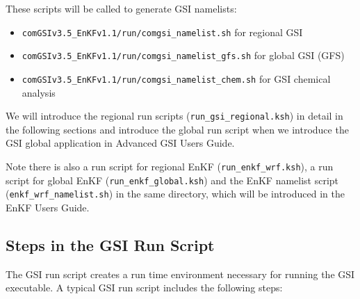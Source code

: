 These scripts will be called to generate GSI namelists:
\begin{itemize}
\item \verb|comGSIv3.5_EnKFv1.1/run/comgsi_namelist.sh| for regional GSI
\item \verb|comGSIv3.5_EnKFv1.1/run/comgsi_namelist_gfs.sh| for global GSI (GFS)
\item \verb|comGSIv3.5_EnKFv1.1/run/comgsi_namelist_chem.sh| for GSI chemical analysis
\end{itemize}

We will introduce the regional run scripts (\verb|run_gsi_regional.ksh|) in detail in the following sections and introduce the global run script when we introduce the GSI global application in Advanced GSI User\textquotesingle s Guide. 

Note there is also a run script for regional EnKF (\verb|run_enkf_wrf.ksh|), a run script for global EnKF (\verb|run_enkf_global.ksh|) and the EnKF namelist script (\verb|enkf_wrf_namelist.sh|) in the same directory, which will be introduced in the EnKF User\textquotesingle s Guide.

\subsection{Steps in the GSI Run Script} 

The GSI run script creates a run time environment necessary for running the GSI executable. A typical GSI run script includes the following steps:

